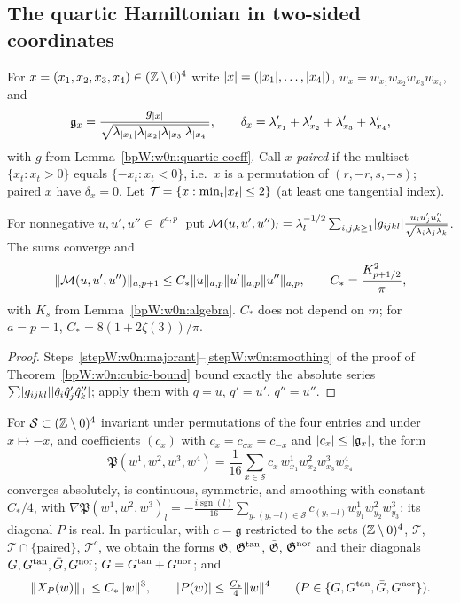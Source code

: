 \subsection{The quartic Hamiltonian in two-sided coordinates}\label{bpW:w3:quartic-sec}

For $x=(x_1,x_2,x_3,x_4)\in(\mathbb{Z}\setminus0)^4$ write $\lvert x\rvert=(\lvert x_1\rvert,\dots,\lvert x_4\rvert)$,
$w_x=w_{x_1}w_{x_2}w_{x_3}w_{x_4}$, and
\[\mathfrak g_x=\frac{g_{\lvert x\rvert}}{\sqrt{\lambda_{\lvert x_1\rvert}\lambda_{\lvert x_2\rvert}\lambda_{\lvert x_3\rvert}\lambda_{\lvert x_4\rvert}}},\qquad
\delta_x=\lambda'_{x_1}+\lambda'_{x_2}+\lambda'_{x_3}+\lambda'_{x_4},\]
with $g$ from Lemma~\ref{bpW:w0n:quartic-coeff}. Call $x$ \emph{paired} if the multiset
$\{x_t:x_t>0\}$ equals $\{-x_t:x_t<0\}$, i.e.\ $x$ is a permutation of $(r,-r,s,-s)$; paired $x$ have $\delta_x=0$.
Let $\mathcal T=\{x:\min_t\lvert x_t\rvert\le2\}$ (at least one tangential index).

\begin{lemma}\label{bpW:w3:majorant}
For nonnegative $u,u',u''\in\ell^{a,p}$ put
$\mathcal M(u,u',u'')_l=\lambda_l^{-1/2}\sum_{i,j,k\ge1}\lvert g_{ijkl}\rvert\frac{u_iu'_ju''_k}{\sqrt{\lambda_i\lambda_j\lambda_k}}$.
The sums converge and
\[\lVert \mathcal M(u,u',u'')\rVert_{a,p+1}\le C_*\lVert u\rVert_{a,p}\lVert u'\rVert_{a,p}\lVert u''\rVert_{a,p},\qquad C_*=\frac{K_{p+1/2}^2}{\pi},\]
with $K_s$ from Lemma~\ref{bpW:w0n:algebra}. $C_*$ does not depend on $m$; for $a=p=1$,
$C_*=8(1+2\zeta(3))/\pi$.
\end{lemma}

\begin{proof}
Steps~\ref{stepW:w0n:majorant}--\ref{stepW:w0n:smoothing} of the proof of Theorem~\ref{bpW:w0n:cubic-bound} bound
exactly the absolute series $\sum\lvert g_{ijkl}\rvert\lvert \hat q_i\hat q'_j\hat q''_k\rvert$; apply them with $q=u$, $q'=u'$,
$q''=u''$.
\end{proof}

\begin{lemma}\label{bpW:w3:quartic}
For $\mathcal S\subset(\mathbb{Z}\setminus0)^4$ invariant under permutations of the four entries and under $x\mapsto-x$,
and coefficients $(c_x)$ with $c_x=c_{\sigma x}=\overline{c_{-x}}$ and $\lvert c_x\rvert\le\lvert \mathfrak g_x\rvert$, the form
\[\mathfrak P(w^1,w^2,w^3,w^4)=\frac1{16}\sum_{x\in\mathcal S}c_x\,w^1_{x_1}w^2_{x_2}w^3_{x_3}w^4_{x_4}\]
converges absolutely, is continuous, symmetric, and smoothing with constant $C_*/4$, with
$\nabla\mathfrak P(w^1,w^2,w^3)_l=-\frac{i\operatorname{sgn}(l)}{16}\sum_{y:(y,-l)\in\mathcal S}c_{(y,-l)}w^1_{y_1}w^2_{y_2}w^3_{y_3}$;
its diagonal $P$ is real. In particular, with $c=\mathfrak g$ restricted to the sets
$(\mathbb{Z}\setminus0)^4$, $\mathcal T$, $\mathcal T\cap\{\text{paired}\}$, $\mathcal T^c$, we obtain the forms
$\mathfrak G$, $\mathfrak G^{\rm tan}$, $\bar{\mathfrak G}$, $\mathfrak G^{\rm nor}$ and their diagonals
$G,G^{\rm tan},\bar G,G^{\rm nor}$; $G=G^{\rm tan}+G^{\rm nor}$; and
\[\lVert X_P(w)\rVert_+\le C_*\lVert w\rVert^3,\qquad\lvert P(w)\rvert\le\tfrac{C_*}4\lVert w\rVert^4\qquad(P\in\{G,G^{\rm tan},\bar G,G^{\rm nor}\}).\]
\end{lemma}

